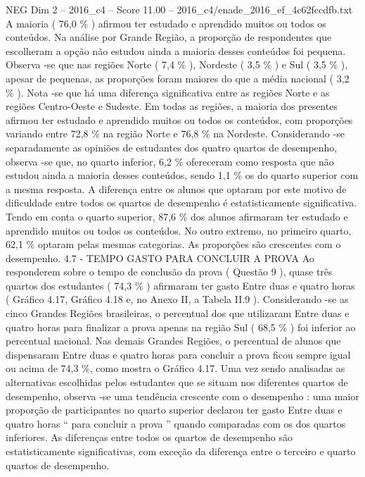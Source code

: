 \begin{textsample}{NEG Dim 2 – 2016\_c4 – Score 11.00 – 2016\_c4/enade\_2016\_ef\_4c62fccdfb.txt}
A maioria ( 76,0 \% ) afirmou ter estudado e aprendido muitos ou todos os conteúdos.
Na análise por Grande Região, a proporção de respondentes que escolheram a opção não estudou ainda a maioria desses conteúdos foi pequena.
Observa -se que nas regiões Norte ( 7,4 \% ), Nordeste ( 3,5 \% ) e Sul ( 3,5 \% ), apesar de pequenas, as proporções foram maiores do que a média nacional ( 3,2 \% ).
Nota -se que há uma diferença significativa entre as regiões Norte e as regiões Centro-Oeste e Sudeste.
Em todas as regiões, a maioria dos presentes afirmou ter estudado e aprendido muitos ou todos os conteúdos, com proporções variando entre 72,8 \% na região Norte e 76,8 \% na Nordeste.
Considerando -se separadamente as opiniões de estudantes dos quatro quartos de desempenho, observa -se que, no quarto inferior, 6,2 \% ofereceram como resposta que não estudou ainda a maioria desses conteúdos, sendo 1,1 \% os do quarto superior com a mesma resposta.
A diferença entre os alunos que optaram por este motivo de dificuldade entre todos os quartos de desempenho é estatisticamente significativa.
Tendo em conta o quarto superior, 87,6 \% dos alunos afirmaram ter estudado e aprendido muitos ou todos os conteúdos.
No outro extremo, no primeiro quarto, 62,1 \% optaram pelas mesmas categorias.
As proporções são crescentes com o desempenho. 4.7 - TEMPO GASTO PARA CONCLUIR A PROVA Ao responderem sobre o tempo de conclusão da prova ( Questão 9 ), quase três quartos dos estudantes ( 74,3 \% ) afirmaram ter gasto Entre duas e quatro horas ( Gráfico 4.17, Gráfico 4.18 e, no Anexo II, a Tabela II.9 ).
Considerando -se as cinco Grandes Regiões brasileiras, o percentual dos que utilizaram Entre duas e quatro horas para finalizar a prova apenas na região Sul ( 68,5 \% ) foi inferior ao percentual nacional.
Nas demais Grandes Regiões, o percentual de alunos que dispensaram Entre duas e quatro horas para concluir a prova ficou sempre igual ou acima de 74,3 \%, como mostra o Gráfico 4.17.
Uma vez sendo analisadas as alternativas escolhidas pelos estudantes que se situam nos diferentes quartos de desempenho, observa -se uma tendência crescente com o desempenho : uma maior proporção de participantes no quarto superior declarou ter gasto Entre duas e quatro horas “ para concluir a prova ” quando comparadas com os dos quartos inferiores.
As diferenças entre todos os quartos de desempenho são estatisticamente significativas, com exceção da diferença entre o terceiro e quarto quartos de desempenho.

\end{textsample}
